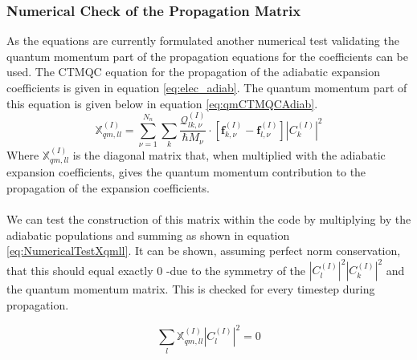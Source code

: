 \subsubsection{Numerical Check of the Propagation Matrix}
\label{sect:sumXqmll}
As the equations are currently formulated another numerical test validating the quantum momentum part of the propagation equations for the coefficients can be used. The CTMQC equation for the propagation of the adiabatic expansion coefficients is given in equation \eqref{eq:elec_adiab}. The quantum momentum part of this equation is given below in equation \eqref{eq:qmCTMQCAdiab}. 
\begin{equation}
  \mathbb{X}_{qm, ll}^{(I)} = \sum_{\nu=1}^{N_n}\sum_{k} \frac{\mathcal{Q}_{lk, \nu}^{(I)}}{\hbar     M_\nu} \cdot \left[ \mathbf{f}_{k,\nu}^{(I)} - \mathbf{f}_{l,\nu}^{(I)}   \right] |C_{k}^{(I)}|^2
  \label{eq:qmCTMQCAdiab}
\end{equation}
Where $\mathbb{X}_{qm, ll}^{(I)}$ is the diagonal matrix that, when multiplied with the adiabatic expansion coefficients, gives the quantum momentum contribution to the propagation of the expansion coefficients.
\\\\
We can test the construction of this matrix within the code by multiplying by the adiabatic populations and summing as shown in equation \eqref{eq:NumericalTestXqmll}. It can be shown, assuming perfect norm conservation, that this should equal exactly 0 -due to the symmetry of the $|C_{l}^{(I)}|^2|C_{k}^{(I)}|^2$ and the quantum momentum matrix. This is checked for every timestep during propagation.

\begin{equation}
  \sum_{l} \mathbb{X}_{qm, ll}^{(I)} |C_{l}^{(I)}|^2 = 0
  \label{eq:NumericalTestXqmll}
\end{equation}


